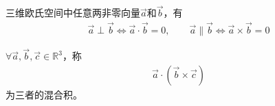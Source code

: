 \begin{theorem}三维欧氏空间中任意两非零向量$\vec a$和$\vec b$，有
  \begin{align*}
    \vec a \perp     \vec b \iff \vec a \cdot  \vec b = 0,\quad\quad
    \vec a \parallel \vec b \iff \vec a \times \vec b = 0
  \end{align*}
\end{theorem}


\begin{definition}
  $\forall \vec a,\vec b,\vec c\in\mathbb{R}^3$，称
  \begin{align*}
    \vec a\cdot(\vec b\times\vec c)
  \end{align*}
  为三者的混合积。
\end{definition}

